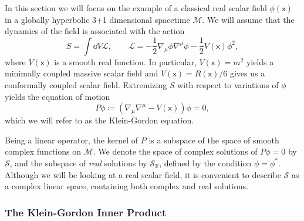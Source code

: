 \documentclass[letterpaper,12pt,titlepage,oneside,final]{book}
\renewcommand{\S}{\mathcal{S}}
\newcommand{\mf}{\mathsf}%
\begin{document}
In this section we will focus on the example of a classical real scalar field $\phi(\mf x)$ in a globally hyperbolic 3+1 dimensional spacetime $\mathcal{M}$. We will assume that the dynamics of the field is associated with the action
\begin{equation}
    S = \int \dd V \mathcal{L}, \quad\quad \mathcal{L} = - \frac{1}{2} \nabla_\mu \phi \nabla^\mu \phi - \frac{1}{2}V(\mf x) \phi^2,
\end{equation}
where $V(\mf x)$ is a smooth real function. In particular, $V(\mf x) = m^2$ yields a minimally coupled massive scalar field and $V(\mf x) = R(\mf x)/6$ gives us a conformally coupled scalar field. Extremizing $S$ with respect to variations of $\phi$ yields the equation of motion
\begin{equation}\label{eq:PKG}
    P\phi \coloneqq (\nabla_\mu \nabla^\mu - V(\mf x)) \phi = 0,
\end{equation}
which we will refer to as the Klein-Gordon equation.


Being a linear operator, the kernel of $P$ is a subspace of the space of smooth complex functions on $\mathcal{M}$. We denote the space of complex solutions of $P\phi = 0$ by $\S$, and the subspace of \textit{real} solutions by $\S_\mathbb{R}$, defined by the condition $\phi = \phi^*$. Although we will be looking at a real scalar field, it is convenient to describe $\S$ as a complex linear space, containing both complex and real solutions. %





\subsubsection*{The Klein-Gordon Inner Product}
\end{document}
